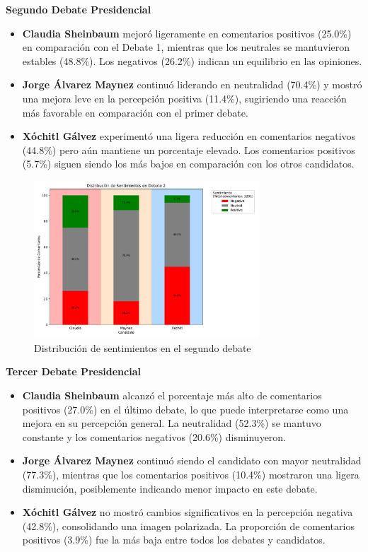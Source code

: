 \documentclass[10pt, a4paper]{article}
\begin{document}
	\textbf{Segundo Debate Presidencial}
	\begin{itemize}
		\item \textbf{Claudia Sheinbaum} mejoró ligeramente en comentarios positivos (25.0\%) en comparación con el Debate 1, mientras que los neutrales se mantuvieron estables (48.8\%). Los negativos (26.2\%) indican un equilibrio en las opiniones.
		\item \textbf{Jorge Álvarez Maynez} continuó liderando en neutralidad (70.4\%) y mostró una mejora leve en la percepción positiva (11.4\%), sugiriendo una reacción más favorable en comparación con el primer debate.
		\item \textbf{Xóchitl Gálvez} experimentó una ligera reducción en comentarios negativos (44.8\%) pero aún mantiene un porcentaje elevado. Los comentarios positivos (5.7\%) siguen siendo los más bajos en comparación con los otros candidatos.
	\end{itemize}
	
	\begin{figure}[h!] %
		\centering
		\includegraphics[width=0.75\textwidth]{sA_debate2.pdf} %
		\caption{Distribución de sentimientos en el segundo debate} %
		\label{fig:sA_debate2} %
	\end{figure}
	
	\textbf{Tercer Debate Presidencial}
	\begin{itemize}
		\item \textbf{Claudia Sheinbaum} alcanzó el porcentaje más alto de comentarios positivos (27.0\%) en el último debate, lo que puede interpretarse como una mejora en su percepción general. La neutralidad (52.3\%) se mantuvo constante y los comentarios negativos (20.6\%) disminuyeron.
		\item \textbf{Jorge Álvarez Maynez} continuó siendo el candidato con mayor neutralidad (77.3\%), mientras que los comentarios positivos (10.4\%) mostraron una ligera disminución, posiblemente indicando menor impacto en este debate.
		\item \textbf{Xóchitl Gálvez} no mostró cambios significativos en la percepción negativa (42.8\%), consolidando una imagen polarizada. La proporción de comentarios positivos (3.9\%) fue la más baja entre todos los debates y candidatos.
	\end{itemize}
	
\end{document}
